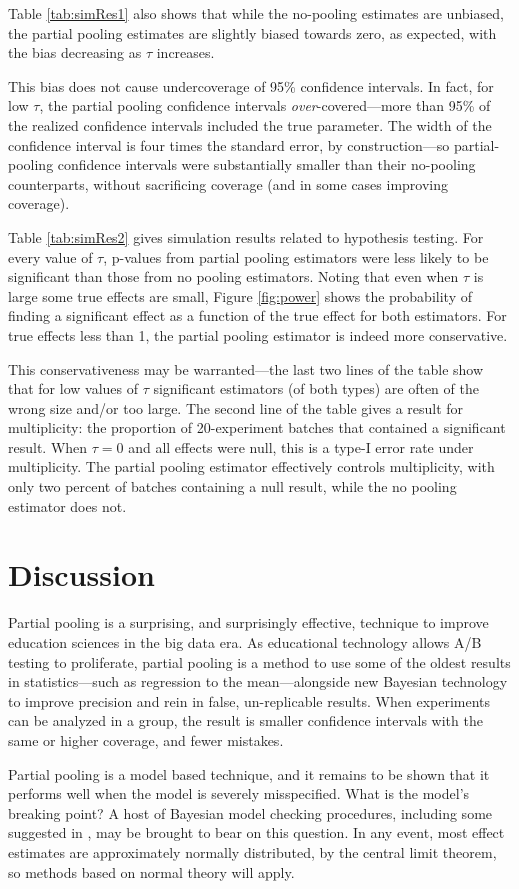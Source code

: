 \documentclass{edm_template}
\begin{document}
Table \ref{tab:simRes1} also shows that while the no-pooling estimates are unbiased, the partial pooling estimates are slightly biased towards zero, as expected, with the bias decreasing as $\tau$ increases.

This bias does not cause undercoverage of 95\% confidence intervals.
In fact, for low $\tau$, the partial pooling confidence intervals \emph{over}-covered---more than 95\% of the realized confidence intervals included the true parameter. 
The width of the confidence interval is four times the standard error, by construction---so partial-pooling confidence intervals were substantially smaller than their no-pooling counterparts, without sacrificing coverage (and in some cases improving coverage). 

Table \ref{tab:simRes2} gives simulation results related to hypothesis testing. For every value of $\tau$, p-values from partial pooling estimators were less likely to be significant than those from no pooling estimators. 
Noting that even when $\tau$ is large some true effects are small, Figure \ref{fig:power} shows the probability of finding a significant effect as a function of the true effect for both estimators. 
For true effects less than 1, the partial pooling estimator is indeed more conservative. 

This conservativeness may be warranted---the last two lines of the table show that for low values of $\tau$ significant estimators (of both types) are often of the wrong size and/or too large. 
The second line of the table gives a result for multiplicity: the proportion of 20-experiment batches that contained a significant result. 
When $\tau=0$ and all effects were null, this is a type-I error rate under multiplicity.
The partial pooling estimator effectively controls multiplicity, with only two percent of batches containing a null result, while the no pooling estimator does not. 


\section{Discussion}

Partial pooling is a surprising, and surprisingly effective, technique to improve education sciences in the big data era. 
As educational technology allows A/B testing to proliferate, partial pooling is a method to use some of the oldest results in statistics---such as regression to the mean---alongside new Bayesian technology to improve precision and rein in false, un-replicable results. 
When experiments can be analyzed in a group, the result is smaller confidence intervals with the same or higher coverage, and fewer mistakes.

Partial pooling is a model based technique, and it remains to be shown that it performs well when the model is severely misspecified. 
What is the model's breaking point?
A host of Bayesian model checking procedures, including some suggested in \cite{rubin}, may be brought to bear on this question. 
In any event, most effect estimates are approximately normally distributed, by the central limit theorem, so methods based on normal theory will apply. 



 
\end{document}
